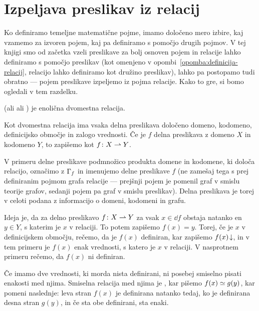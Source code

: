 

        \section{Izpeljava preslikav iz relacij}\label{razdelek:izpeljava-preslikav-iz-relacij}

                Ko definiramo temeljne matematične pojme, imamo določeno mero izbire, kaj vzamemo za izvoren pojem, kaj pa definiramo s pomočjo drugih pojmov. V tej knjigi smo od začetka vzeli preslikave za bolj osnoven pojem in relacije lahko definiramo s pomočjo preslikav (kot omenjeno v opombi~\ref{opomba:definicija-relacij}, relacijo lahko definiramo kot družino preslikav), lahko pa postopamo tudi obratno --- pojem preslikave izpeljemo iz pojma relacije. Kako to gre, si bomo ogledali v tem razdelku.

                \begin{definicija}
                         (ali  ali ) je enolična dvomestna relacija.
                \end{definicija}

                Kot dvomestna relacija ima vsaka delna preslikava določeno domeno, kodomeno, definicijsko območje in zalogo vrednosti. Če je $f$ delna preslikava z domeno $X$ in kodomeno $Y$, to zapišemo kot $f\colon X \mathrel{\rightharpoonup} Y$.

                V primeru delne preslikave podmnožico produkta domene in kodomene, ki določa relacijo, označimo z $\Gamma_{f}$ in imenujemo  delne preslikave $f$ (ne zamešaj tega s prej definiranim pojmom grafa relacije --- prejšnji pojem je pomenil graf v smislu teorije grafov, sedanji pojem pa graf v smislu preslikav). Delna preslikava je torej v celoti podana z informacijo o domeni, kodomeni in grafu.

                Ideja je, da za delno preslikavo $f\colon X \mathrel{\rightharpoonup} Y$ za vsak $x \in \dd{f}$ obstaja natanko en $y \in Y$, s katerim je $x$ v relaciji. To potem zapišemo $f(x) = y$. Torej, če je $x$ v definicijskem območju, rečemo, da je $f(x)$ definiran, kar zapišemo ${f(x)}\!\downarrow$, in v tem primeru je $f(x)$ enak vrednosti, s katero je $x$ v relaciji. V nasprotnem primeru rečemo, da $f(x)$ ni definiran.

                Če imamo dve vrednosti, ki morda nista definirani, ni posebej smiselno pisati enakosti med njima. Smiselna relacija med njima je , kar pišemo $f(x) \simeq g(y)$, kar pomeni naslednje: leva stran $f(x)$ je definirana natanko tedaj, ko je definirana desna stran $g(y)$, in če sta obe definirani, sta enaki.

